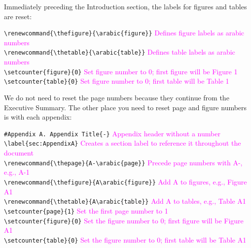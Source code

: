 \documentclass[12pt,]{article}
\begin{document}
Immediately preceding the Introduction section, the labels for figures
and tables are reset:

\texttt{\textbackslash{}renewcommand\{\textbackslash{}thefigure\}\{\textbackslash{}arabic\{figure\}\}}
\textcolor{magenta}{Defines figure labels as arabic numbers}\\
\texttt{\textbackslash{}renewcommand\{\textbackslash{}thetable\}\{\textbackslash{}arabic\{table\}\}}
\textcolor{magenta}{Defines table labels as arabic numbers}\\
\texttt{\textbackslash{}setcounter\{figure\}\{0\}}
\textcolor{magenta}{Set figure number to 0; first figure will be Figure 1}\\
\texttt{\textbackslash{}setcounter\{table\}\{0\}}
\textcolor{magenta}{Set figure number to 0; first table will be Table 1}

\vspace{.5cm}

We do not need to reset the page numbers because they continue from the
Executive Summary. The other place you need to reset page and figure
numbers is with each appendix:

\texttt{\#Appendix\ A.\ Appendix\ Title\{-\}}
\textcolor{magenta}{Appendix header without a number}\\
\texttt{\textbackslash{}label\{sec:AppendixA\}}
\textcolor{magenta}{Creates a section label to reference it throughout the document}\\
\texttt{\textbackslash{}renewcommand\{\textbackslash{}thepage\}\{A-\textbackslash{}arabic\{page\}\}}
\textcolor{magenta}{Precede page numbers with A-, e.g., A-1}\\
\texttt{\textbackslash{}renewcommand\{\textbackslash{}thefigure\}\{A\textbackslash{}arabic\{figure\}\}}
\textcolor{magenta}{Add A to figures, e.g., Figure A1}\\
\texttt{\textbackslash{}renewcommand\{\textbackslash{}thetable\}\{A\textbackslash{}arabic\{table\}\}}
\textcolor{magenta}{Add A to tables, e.g., Table A1}\\
\texttt{\textbackslash{}setcounter\{page\}\{1\}}
\textcolor{magenta}{Set the first page number to 1}\\
\texttt{\textbackslash{}setcounter\{figure\}\{0\}}
\textcolor{magenta}{Set the figure number to 0; first figure will be Figure A1}\\
\texttt{\textbackslash{}setcounter\{table\}\{0\}}
\textcolor{magenta}{Set the figure number to 0; first table will be Table A1}

\vspace{.5cm}
\end{document}
